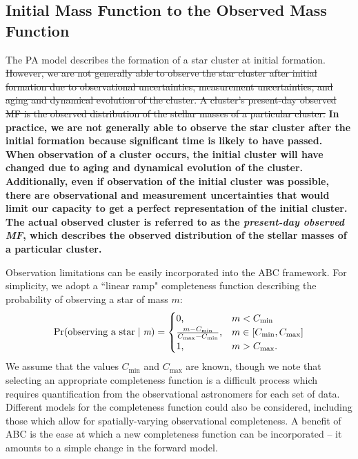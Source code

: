 \documentclass[ejs]{imsart}
\numberwithin{equation}{section}
\theoremstyle{plain}
\newcommand{\new}[1]{{\bf #1}}
\newcommand{\remove}[1]{\st{#1}}
\newcommand{\Proba}{\rm{Pr}}
\newcommand{\Cmin}{C_{\text{min}}}
\newcommand{\Cmax}{C_{\text{max}}}
\begin{document}
\subsection{Initial Mass Function to the Observed Mass Function} \label{sec:obs_challenges}
The PA model describes the formation of a star cluster at initial formation.  \remove{However, we are not generally able to observe the star cluster after initial formation due to observational uncertainties, measurement uncertainties, and aging and dynamical evolution of the cluster.  A cluster's present-day observed MF is the observed distribution of the stellar masses of a particular cluster.}
\new{In practice, we are not generally able to observe the star cluster after the initial formation because significant time is likely to have passed.  When observation of a cluster occurs, the initial cluster will have changed due to aging and dynamical evolution of the cluster.  Additionally, even if observation of the initial cluster was possible, there are observational and measurement uncertainties that would limit our capacity to get a perfect representation of the initial cluster.  The actual observed cluster is referred to as the \emph{present-day observed MF}, which describes the observed distribution of the stellar masses of a particular cluster.}





Observation limitations can be easily incorporated into the ABC framework.  For simplicity, we adopt a ``linear ramp" completeness function describing the probability of observing a star of mass $m$:
\begin{align}
	\Proba(\text{observing a star} \mid \emph{m}) = \begin{cases} 0 \text{,} & m < \Cmin\\
								\frac{m - \Cmin}{\Cmax - \Cmin}\text{,} & m \in [\Cmin, \Cmax] \\
								1 \text{,} & m > \Cmax \text{.}
								\end{cases} \label{eq:ramp}
\end{align}
We assume that the values $\Cmin$ and $\Cmax$ are known, though we note that selecting an appropriate completeness function is a difficult process which requires quantification from the observational astronomers for each set of data.
Different models for the completeness function could also be considered, including those which allow for spatially-varying observational completeness.  A benefit of ABC is the ease at which a new completeness function can be incorporated -- it amounts to a simple change in the forward model.  
\end{document}
